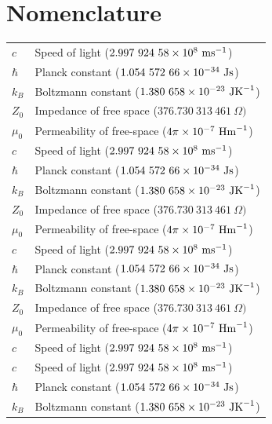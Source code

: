 \chapter*{Nomenclature}

\setlength\LTleft{0pt}
\setlength\LTright{0pt}
\begin{xltabular}{\textwidth}{@{}l X@{}}

    $c$     & Speed of light ($2.997\ 924\ 58 \e{8}\ \mbox{ms}^{-1}$)    \\
    $\hbar$ & Planck constant ($1.054\ 572\ 66\e{-34}\ \mbox{Js}$)       \\
    $k_B$   & Boltzmann constant  ($1.380\ 658\e{-23}\ \mbox{JK}^{-1} $) \\
    $Z_0$   & Impedance of free space  ($376.730\ 313\ 461\ \Omega) $    \\
    $\mu_0$ & Permeability of free-space ($4\pi\e{-7}\ \mbox{Hm}^{-1}$)  \\
    $c$     & Speed of light ($2.997\ 924\ 58 \e{8}\ \mbox{ms}^{-1}$)    \\
    $\hbar$ & Planck constant ($1.054\ 572\ 66\e{-34}\ \mbox{Js}$)       \\
    $k_B$   & Boltzmann constant  ($1.380\ 658\e{-23}\ \mbox{JK}^{-1} $) \\
    $Z_0$   & Impedance of free space  ($376.730\ 313\ 461\ \Omega) $    \\
    $\mu_0$ & Permeability of free-space ($4\pi\e{-7}\ \mbox{Hm}^{-1}$)  \\
    $c$     & Speed of light ($2.997\ 924\ 58 \e{8}\ \mbox{ms}^{-1}$)    \\
    $\hbar$ & Planck constant ($1.054\ 572\ 66\e{-34}\ \mbox{Js}$)       \\
    $k_B$   & Boltzmann constant  ($1.380\ 658\e{-23}\ \mbox{JK}^{-1} $) \\
    $Z_0$   & Impedance of free space  ($376.730\ 313\ 461\ \Omega) $    \\
    $\mu_0$ & Permeability of free-space ($4\pi\e{-7}\ \mbox{Hm}^{-1}$)  \\
    $c$     & Speed of light ($2.997\ 924\ 58 \e{8}\ \mbox{ms}^{-1}$)    \\
    $c$     & Speed of light ($2.997\ 924\ 58 \e{8}\ \mbox{ms}^{-1}$)    \\
    $\hbar$ & Planck constant ($1.054\ 572\ 66\e{-34}\ \mbox{Js}$)       \\
    $k_B$   & Boltzmann constant  ($1.380\ 658\e{-23}\ \mbox{JK}^{-1} $) \\

\end{xltabular}
